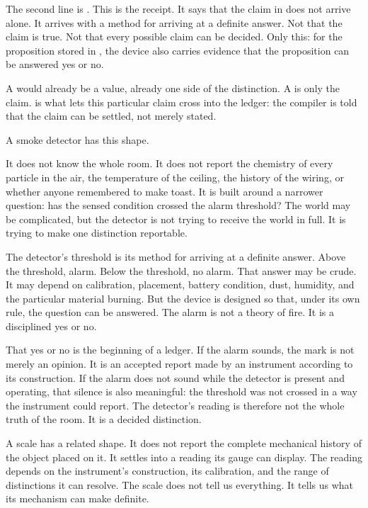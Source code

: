 The second line is . This is the receipt. It
says that the claim in  does not arrive alone. It arrives with a
method for arriving at a definite answer. Not that the claim is true. Not that
every possible claim can be decided. Only this: for the proposition stored in
, the device also carries evidence that the proposition can be
answered yes or no.

A  would already be a value, already one side of the distinction. A
 is only the claim.  is what lets this
particular claim cross into the ledger: the compiler is told that the claim can
be settled, not merely stated.

A smoke detector has this shape.

It does not know the whole room. It does not report the chemistry of every
particle in the air, the temperature of the ceiling, the history of the wiring,
or whether anyone remembered to make toast. It is built around a narrower
question: has the sensed condition crossed the alarm threshold? The world may
be complicated, but the detector is not trying to receive the world in full. It
is trying to make one distinction reportable.

The detector's threshold is its method for arriving at a definite answer. Above
the threshold, alarm. Below the threshold, no alarm. That answer may be crude.
It may depend on calibration, placement, battery condition, dust, humidity, and
the particular material burning. But the device is designed so that, under its
own rule, the question can be answered. The alarm is not a theory of fire. It is
a disciplined yes or no.

That yes or no is the beginning of a ledger. If the alarm sounds, the mark is
not merely an opinion. It is an accepted report made by an instrument according
to its construction. If the alarm does not sound while the detector is present
and operating, that silence is also meaningful: the threshold was not crossed
in a way the instrument could report. The detector's reading is therefore not
the whole truth of the room. It is a decided distinction.

A scale has a related shape. It does not report the complete mechanical history
of the object placed on it. It settles into a reading its gauge can display. The
reading depends on the instrument's construction, its calibration, and the
range of distinctions it can resolve. The scale does not tell us everything. It
tells us what its mechanism can make definite.

